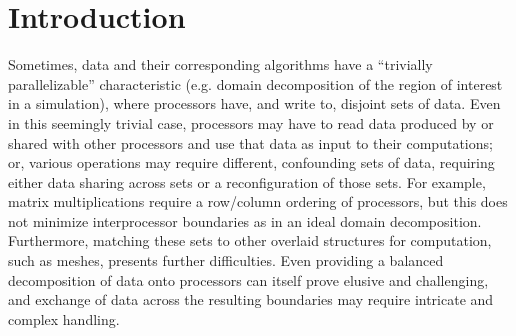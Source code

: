 \chapter{Introduction}
Sometimes, data and their corresponding algorithms have a ``trivially
parallelizable'' characteristic (e.g. domain decomposition of the region of
interest in a simulation), where processors have, and write to, disjoint sets of
data. Even in this seemingly trivial case, processors may have to read data
produced by or shared with other processors and use that data as input to their
computations; or, various operations may require different, confounding sets of
data, requiring either data sharing across sets or a reconfiguration of those
sets. For example, matrix multiplications require a row/column ordering of
processors, but this does not minimize interprocessor boundaries as in an ideal
domain decomposition. Furthermore, matching these sets to other overlaid
structures for computation, such as meshes, presents further difficulties. Even
providing a balanced decomposition of data onto processors can itself prove
elusive and challenging, and exchange of data across the resulting boundaries may
require intricate and complex handling.

